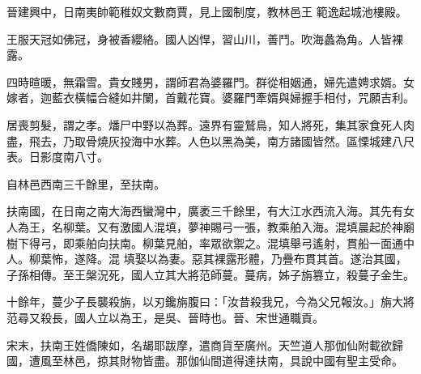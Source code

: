 \begin{pinyinscope}
 晉建興中，日南夷帥範稚奴文數商賈，見上國制度，教林邑王
 範逸起城池樓殿。



 王服天冠如佛冠，身被香纓絡。國人凶悍，習山川，善鬥。吹海蠡為角。人皆裸露。



 四時暄暖，無霜雪。貴女賤男，謂師君為婆羅門。群從相姻通，婦先遣娉求婿。女嫁者，迦藍衣橫幅合縫如井闌，首戴花寶。婆羅門牽婿與婦握手相付，咒願吉利。



 居喪剪髮，謂之孝。燔尸中野以為葬。遠界有靈鷲鳥，知人將死，集其家食死人肉盡，飛去，乃取骨燒灰投海中水葬。人色以黑為美，南方諸國皆然。區慄城建八尺表。日影度南八寸。



 自林邑西南三千餘里，至扶南。



 扶南國，在日南之南大海西蠻灣中，廣袤三千餘里，有大江水西流入海。其先有女人為王，名柳葉。又有激國人混填，夢神賜弓一張，教乘舶入海。混填晨起於神廟樹下得弓，即乘舶向扶南。柳葉見舶，率眾欲禦之。混填舉弓遙射，貫船一面通中人。柳葉怖，遂降。混
 填娶以為妻。惡其裸露形體，乃疊布貫其首。遂治其國，子孫相傳。至王槃況死，國人立其大將范師蔓。蔓病，姊子旃篡立，殺蔓子金生。



 十餘年，蔓少子長襲殺旃，以刃鑱旃腹曰：「汝昔殺我兄，今為父兄報汝。」旃大將范尋又殺長，國人立以為王，是吳、晉時也。晉、宋世通職貢。



 宋末，扶南王姓僑陳如，名朅耶跋摩，遣商貨至廣州。天竺道人那伽仙附載欲歸國，遭風至林邑，掠其財物皆盡。那伽仙間道得達扶南，具說中國有聖主受命。




\end{pinyinscope}
